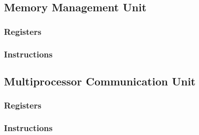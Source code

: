 \documentclass[letterpaper, 11pt]{article}
\begin{document}
\subsection{Memory Management Unit}
\subsubsection{Registers}
\subsubsection{Instructions}
\subsection{Multiprocessor Communication Unit}
\subsubsection{Registers}
\subsubsection{Instructions}
\end{document}
